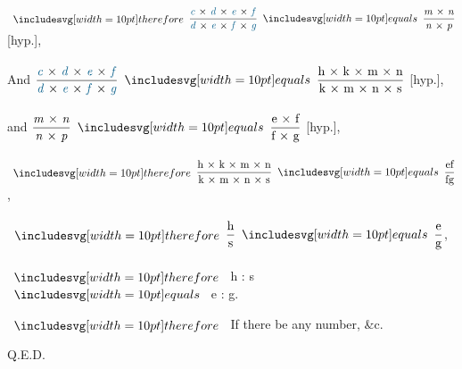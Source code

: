 \documentclass[12pt,preview]{standalone}
\begin{document}
\newpage

\begin{minipage}{\textwidth}
    \begin{center}
        \begin{onehalfspace}
            $\btherefore \dfrac{\text{\bluec\ × \blued\ × \bluee\ × \bluef}}{\text{\blued\ × \bluee\ × \bluef\ × \blueg}} \bequals \dfrac{\text{\textit{m}\ × \textit{n}}}{\text{\textit{n}\ × \textit{p}}}$ [hyp.],\\
            \hfill\\
            And $\dfrac{\text{\bluec\ × \blued\ × \bluee\ × \bluef}}{\text{\blued\ × \bluee\ × \bluef\ × \blueg}} \bequals \dfrac{\text{h × k × m × n}}{\text{k × m × n × s}}$ [hyp.],\\
            \hfill\\
            and $\dfrac{\text{\textit{m}\ × \textit{n}}}{\text{\textit{n}\ × \textit{p}}} \bequals \dfrac{\text{e × f}}{\text{f × g}}$ [hyp.],\\
            \hfill\\
            $\btherefore \dfrac{\text{h × k × m × n}}{\text{k × m × n × s}} \bequals \dfrac{\text{ef}}{\text{fg}}$,\\
            \hfill\\
            $\btherefore \dfrac{\text{h}}{\text{s}} \bequals \dfrac{\text{e}}{\text{g}}$,\\
            \hfill\\
            $\btherefore$ h : s $\bequals$ e : g.
        \end{onehalfspace}
    \end{center}

    \hfill

    $\btherefore$ If there be any number, \&c.

    \hfill

    \hfill Q.E.D.
\end{minipage}
\end{document}
